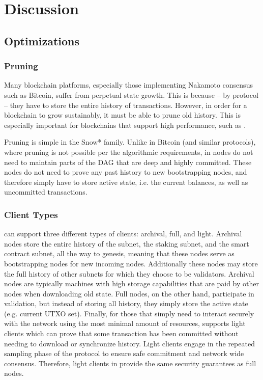 \documentclass[runningheads]{llncs}
\begin{document}
\section{Discussion}
\label{section:discussion}
\subsection{Optimizations}
\subsubsection{Pruning}
Many blockchain platforms, especially those implementing Nakamoto consensus such as Bitcoin, suffer from perpetual state growth. This is because -- by protocol -- they have to store the entire history of transactions. However, in order for a blockchain to grow sustainably, it must be able to prune old history. This is especially important for blockchains that support high performance, such as \AVAPlatformName{}. 

Pruning is simple in the Snow* family. Unlike in Bitcoin (and similar protocols), where pruning is not possible per the algorithmic requirements, in \AVATokenName{} nodes do not need to maintain parts of the DAG that are deep and highly committed. These nodes do not need to prove any past history to new bootstrapping nodes, and therefore simply have to store active state, i.e. the current balances, as well as uncommitted transactions. 

\subsubsection{Client Types}
\AVAPlatformName{} can support three different types of clients: archival, full, and light. 
Archival nodes store the entire history of the \AVATokenName{} subnet, the staking subnet, and the smart contract subnet, all the way to genesis, meaning that these nodes serve as bootstrapping nodes for new incoming nodes. Additionally these nodes may store the full history of other subnets for which they choose to be validators. Archival nodes are typically machines with high storage capabilities that are paid by other nodes when downloading old state. Full nodes, on the other hand, participate in validation, but instead of storing all history, they simply store the active state (e.g. current UTXO set). Finally, for those that simply need to interact securely with the network using the most minimal amount of resources, \AVAPlatformName{} supports light clients which can prove that some transaction has been committed without needing to download or synchronize history. 
Light clients engage in the repeated sampling phase of the protocol to ensure safe commitment and network wide consensus. Therefore, light clients in \AVAPlatformName{} provide the same security guarantees as full nodes. 
\end{document}
